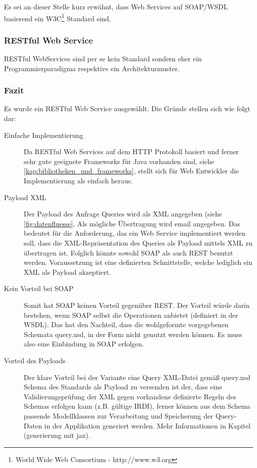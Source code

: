 Es sei an dieser Stelle kurz erwähnt, dass Web Services auf SOAP/WSDL basierend ein W3C\footnote{World Wide Web Consortium - http://www.w3.org} Standard sind. 

\subsubsection{RESTful Web Service}  
RESTful WebServices sind per se kein Standard sondern eher ein Programmierparadigma respektive ein Architekturmuster. 

\subsubsection{Fazit}
Es wurde ein RESTful Web Service ausgewählt. Die Gründe stellen sich wie folgt dar:

\begin{description}
\item[Einfache Implementierung] Da RESTful Web Services auf dem HTTP Protokoll basiert und ferner sehr gute geeignete Frameworks für Java vorhanden sind, siehe \autoref{kap:bibliotheken_und_frameworks}, stellt sich für Web Entwickler die Implementierung als einfach heraus.
\item[Payload XML] Der Payload des Anfrage Queries wird als XML angegeben (siehe \autoref{fig:datenfluesse}. Als mögliche Übertragung wird email angegeben. Das bedeutet für die Anforderung, das ein Web Service  implementiert werden soll, dass die XML-Repräsentation des Queries als Payload mittels XML zu übertragen ist. Folglich könnte sowohl SOAP als auch REST benutzt werden. Voraussetzung ist eine definierten Schnittstelle, welche lediglich ein XML als Payload akzeptiert. 
\item[Kein Vorteil bei SOAP] Somit hat SOAP keinen Vorteil gegenüber REST. Der Vorteil würde darin bestehen, wenn SOAP selbst die Operationen anbietet (definiert in der WSDL). Das hat den Nachteil, dass die wohlgeformte vorgegebenen Schemata query.xsd, in der Form nicht genutzt werden können. Es muss also eine Einbindung in SOAP erfolgen. 
\item[Vorteil des Payloads] Der klare Vorteil bei der Variante eine Query XML-Datei gemäß query.xsd Schema des Standards als Payload zu versenden ist der, dass eine Validierungsprüfung der XML gegen vorhandene definierte Regeln des Schemas erfolgen kann (z.B. gültige IRDI), ferner können aus dem Schema passende Modellklassen zur Verarbeitung und Speicherung der Query-Daten in der Applikation generiert werden. Mehr Informationen in Kapitel  (generierung mit jax).  
\end{description}

